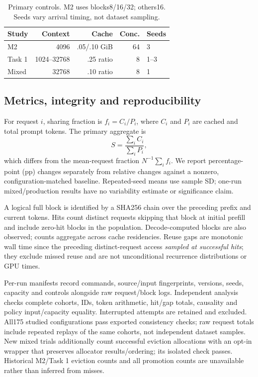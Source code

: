 \documentclass{article}
\begin{document}
\begin{table}[t]
\centering\small
\caption{Primary controls. M2 uses blocks8/16/32; others16. Seeds vary arrival timing, not dataset sampling.}
\begin{tabular}{lrrrl}\toprule
Study & Context & Cache & Conc. & Seeds\\\midrule
M2 & 4096 & .05/.10 GiB & 64 & 3\\
Task 1 & 1024--32768 & .25 ratio & 8 & 1--3\\
Mixed & 32768 & .10 ratio & 8 & 1\\\bottomrule
\end{tabular}
\end{table}

\subsection{Metrics, integrity and reproducibility}
For request $i$, sharing fraction is $f_i=C_i/P_i$, where $C_i$ and $P_i$ are cached and total prompt tokens. The primary aggregate is
\begin{equation}
S=\frac{\sum_i C_i}{\sum_i P_i},
\end{equation}
which differs from the mean-request fraction $N^{-1}\sum_i f_i$. We report percentage-point (pp) changes separately from relative changes against a nonzero, configuration-matched baseline. Repeated-seed means use sample SD; one-run mixed/production results have no variability estimate or significance claim.

A logical full block is identified by a SHA256 chain over the preceding prefix and current tokens. Hits count distinct requests skipping that block at initial prefill and include zero-hit blocks in the population. Decode-computed blocks are also observed; counts aggregate across cache residencies. Reuse gaps are monotonic wall time since the preceding distinct-request access \emph{sampled at successful hits}; they exclude missed reuse and are not unconditional recurrence distributions or GPU times.

Per-run manifests record commands, source/input fingerprints, versions, seeds, capacity and controls alongside raw request/block logs. Independent analysis checks complete cohorts, IDs, token arithmetic, hit/gap totals, causality and policy input/capacity equality. Interrupted attempts are retained and excluded. All175 studied configurations pass exported consistency checks; raw request totals include repeated replays of the same cohorts, not independent dataset samples. New mixed trials additionally count successful eviction allocations with an opt-in wrapper that preserves allocator results/ordering; its isolated check passes. Historical M2/Task 1 eviction counts and all promotion counts are unavailable rather than inferred from misses.
\end{document}
